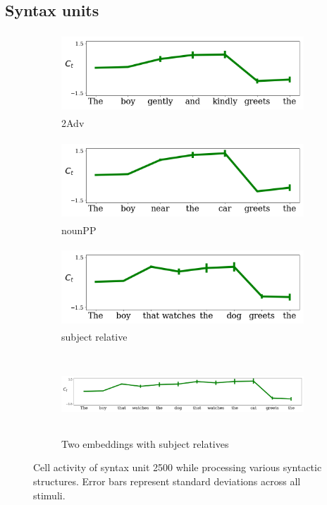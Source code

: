 \subsection{Syntax units}
\label{sec:syntax-units}

\begin{figure}[t]
    \begin{subfigure}{0.32\textwidth}
            \centering
            \includegraphics[width=\linewidth, height=3cm]{Figures/adv_conjunction_1149_cell}
            \caption{2Adv}
            \label{fig:syntax-unit-2Adv}
    \end{subfigure}
    \begin{subfigure}{0.32\textwidth}
            \centering
            \includegraphics[width=\linewidth, height=3cm]{Figures/nounpp_1149_cell.png}
            \caption{nounPP}
            \label{fig:syntax-unit-nounpp}
    \end{subfigure}
    \begin{subfigure}{0.32\textwidth}
            \centering
            \includegraphics[width=\linewidth, height=3cm]{Figures/subjrel_that_1149_cell.png}
            \caption{subject relative}
            \label{fig:syntax-unit-subjrel}
    \end{subfigure}
    \begin{subfigure}{\textwidth}
            \centering
            \includegraphics[width=\linewidth, height=3cm]{Figures/double_subjrel_that_1149_cell.png}
            \caption{Two embeddings with subject relatives}
            \label{fig:syntax-unit-double-subjrel}
    \end{subfigure}
\caption{Cell activity of syntax unit \unit{2}{500} while processing various syntactic structures. Error bars represent standard deviations across all stimuli. }
\end{figure}

